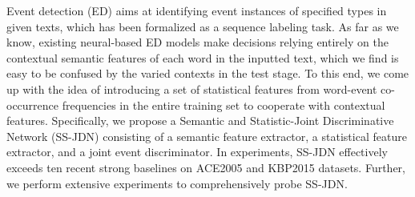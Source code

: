 Event detection (ED) aims at identifying event instances of specified types in given texts, which has been formalized as a sequence labeling task. As far as we know, existing neural-based ED models make decisions relying entirely on the contextual semantic features of each word in the inputted text, which we find is easy to be confused by the varied contexts in the test stage. To this end, we come up with the idea of introducing a set of statistical features from word-event co-occurrence frequencies in the entire training set to cooperate with contextual features. Specifically, we propose a Semantic and Statistic-Joint Discriminative Network (SS-JDN) consisting of a semantic feature extractor, a statistical feature extractor, and a joint event discriminator. In experiments, SS-JDN effectively exceeds ten recent strong baselines on ACE2005 and KBP2015 datasets. Further, we perform extensive experiments to comprehensively probe SS-JDN.
